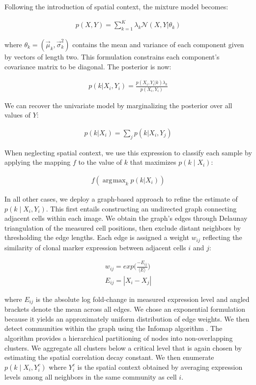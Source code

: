 \documentclass[10pt,letterpaper]{article}
\DeclareMathOperator*{\argmax}{\arg\!\max} %
\begin{document}
Following the introduction of spatial context, the mixture model becomes:
\begin{linenomath} \begin{gather}
\label{eq:bivariate_mixture}
p(X, Y) = \sum^{K}_{k=1}\lambda_k \mathcal{N}( X,Y |\theta_{k})
\end{gather} \end{linenomath}
where $\theta_{k} = (\vec{\mu}_{k},\vec{\sigma}_{k}^2)$ contains the mean and variance of each component given by vectors of length two. This formulation constrains each component's covariance matrix to be diagonal. The posterior is now:
\begin{linenomath} \begin{gather}
p(k| X_i,Y_i) = \frac{p(X_i, Y_i | k) \lambda_k}{p(X_i, Y_i)}
\end{gather} \end{linenomath}
We can recover the univariate model by marginalizing the posterior over all values of $Y$:
\begin{linenomath} \begin{gather}
p(k| X_i) = \sum_{j} p(k| X_i,Y_j)
\end{gather} \end{linenomath}
When neglecting spatial context, we use this expression to classify each sample by applying the mapping $f$ to the value of $k$ that maximizes $p(k \mid X_i)$:
\begin{linenomath} \begin{gather}
f(\argmax_{k} p(k | X_i))
\end{gather} \end{linenomath}

In all other cases, we deploy a graph-based approach to refine the estimate of $p(k \mid X_i,Y_i)$. This first entails constructing an undirected graph connecting adjacent cells within each image. We obtain the graph's edges through Delaunay triangulation of the measured cell positions, then exclude distant neighbors by thresholding the edge lengths. Each edge is assigned a weight $w_{ij}$ reflecting the similarity of clonal marker expression between adjacent cells $i$ and $j$:
\begin{linenomath} \begin{gather}
w_{ij} = exp \big( \frac{-E_{ij}}{\langle E \rangle} \big)\\
E_{ij} = | X_i - X_j | 
\end{gather} \end{linenomath}
where $E_{ij}$ is the absolute log fold-change in measured expression level and angled brackets denote the mean across all edges. We chose an exponential formulation because it yields an approximately uniform distribution of edge weights. We then detect communities within the graph using the Infomap algorithm \cite{Rosvall2009}. The algorithm provides a hierarchical partitioning of nodes into non-overlapping clusters. We aggregate all clusters below a critical level that is again chosen by estimating the spatial correlation decay constant. We then enumerate $p(k \mid X_i,Y_i^c)$ where $Y_i^c$ is the spatial context obtained by averaging expression levels among all neighbors in the same community as cell $i$.
\end{document}
